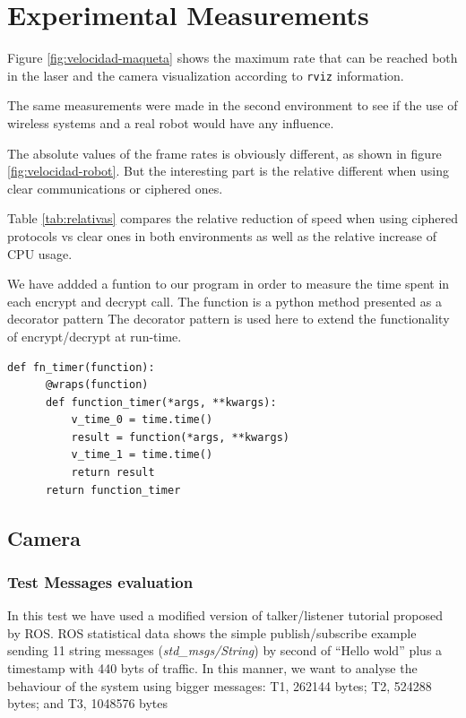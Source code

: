 \documentclass[journal,twoside]{JoPhA}
\begin{document}
\section{Experimental Measurements}

Figure \ref{fig:velocidad-maqueta} shows the maximum rate that can be reached both in the laser and the camera visualization according to \texttt{rviz} information.

The same measurements were made in the second environment to see if the use of wireless systems and a real robot would have any influence.

The absolute values of the frame rates is obviously different, as shown in figure \ref{fig:velocidad-robot}. But the interesting part is the relative different when using clear communications or ciphered ones. 

Table \ref{tab:relativas}  compares the relative reduction of speed when using ciphered protocols vs clear ones in both environments as well as the relative increase of CPU usage.

We have addded a funtion to our program in order to measure the time spent in each encrypt and decrypt call. The function is a python method presented as a decorator pattern 
The decorator pattern is used here to extend the functionality of encrypt/decrypt at run-time. 


{
  \footnotesize{
    \begin{Verbatim}[frame=single]
def fn_timer(function):
	  @wraps(function)
	  def function_timer(*args, **kwargs):
	      v_time_0 = time.time()
	      result = function(*args, **kwargs)
	      v_time_1 = time.time()
	      return result
	  return function_timer
    \end{Verbatim}
  }
}


\subsection{Camera}

\subsubsection{Test Messages evaluation}

In this test we have used a modified version of talker/listener tutorial proposed by ROS. 
ROS statistical data shows the simple publish/subscribe example sending 11 string messages ({\em std\_msgs/String}) by second of ``Hello wold'' plus a timestamp with 440 byts of traffic.
In this manner, we want to analyse the behaviour of the system using bigger messages: T1, 262144 bytes; T2,  524288 bytes; and T3, 1048576 bytes 
\end{document}
